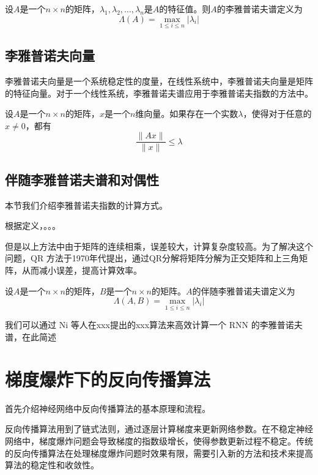 \documentclass[12pt,a4paper]{amsart}
\begin{document}
\begin{definition}[李雅普诺夫谱]
设$A$是一个$n\times n$的矩阵，$\lambda_1,\lambda_2,\ldots,\lambda_n$是$A$的特征值。则$A$的李雅普诺夫谱定义为
\[
\Lambda(A)=\max_{1\leq i\leq n}|\lambda_i|
\]
\end{definition}

\subsection{李雅普诺夫向量}

李雅普诺夫向量是一个系统稳定性的度量，在线性系统中，李雅普诺夫向量是矩阵的特征向量。对于一个线性系统，李雅普诺夫谱应用于李雅普诺夫指数的方法中。

\begin{definition}[李雅普诺夫向量]
设$A$是一个$n\times n$的矩阵，$x$是一个$n$维向量。如果存在一个实数$\lambda$，使得对于任意的$x\neq 0$，都有
\[
\frac{\|Ax\|}{\|x\|}\leq \lambda
\]
\end{definition}

\subsection{伴随李雅普诺夫谱和对偶性}

本节我们介绍李雅普诺夫指数的计算方式。

根据定义，。。。

但是以上方法中由于矩阵的连续相乘，误差较大，计算复杂度较高。为了解决这个问题，QR 方法于1970年代提出，通过QR分解将矩阵分解为正交矩阵和上三角矩阵，从而减小误差，提高计算效率。

\begin{definition}[伴随李雅普诺夫谱]
设$A$是一个$n\times n$的矩阵，$B$是一个$n\times n$的矩阵。$A$的伴随李雅普诺夫谱定义为
\[
\Lambda(A,B)=\max_{1\leq i\leq n}|\lambda_i|
\]
\end{definition}

我们可以通过 Ni 等人在xxx提出的xxx算法来高效计算一个 RNN 的李雅普诺夫谱，在此简述

\section{梯度爆炸下的反向传播算法}

首先介绍神经网络中反向传播算法的基本原理和流程。

反向传播算法用到了链式法则，通过逐层计算梯度来更新网络参数。在不稳定神经网络中，梯度爆炸问题会导致梯度的指数级增长，使得参数更新过程不稳定。传统的反向传播算法在处理梯度爆炸问题时效果有限，需要引入新的方法和技术来提高算法的稳定性和收敛性。
\end{document}
